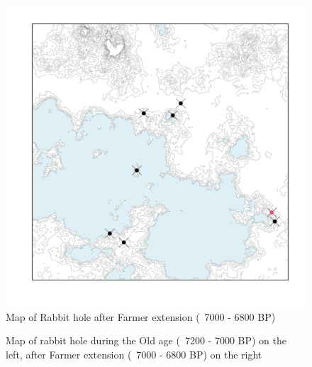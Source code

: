 \documentclass[10pt]{paper}
\begin{document}
\begin{figure}
    \centering
    \includegraphics[width=.65\textwidth]{newages}
    \caption{Map of Rabbit hole after Farmer extension  (~7000 - 6800 BP)  }
    \label{fig:oldage}
\end{figure}
\begin{figure}
    \centering
    \caption{Map of rabbit hole during the Old age (~7200 - 7000 BP) on the left, after Farmer extension  (~7000 - 6800 BP) on the right }
    \label{fig:twomaps}
\end{figure}
\end{document}

